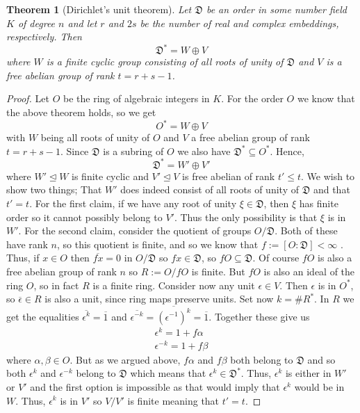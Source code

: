 \documentclass{article}
\newtheorem{theorem}{Theorem}[section]
\newcommand{\mfrak}[1]{\mathfrak{#1}}
\numberwithin{equation}{section}
\begin{document}
\begin{theorem}[Dirichlet's unit theorem]\label{thm: Generalized Dirichlet}
	Let $\mfrak D$ be an order in some number field $K$ of degree $n$ and let $r$ and $2s$ be the number of real and complex embeddings, respectively. Then $$\mfrak D^* = W \oplus V$$
	where $W$ is a finite cyclic group consisting of all roots of unity of $\mfrak D$ and $V$ is a free abelian group of rank $t = r + s - 1$.
\end{theorem}
\begin{proof}
	Let $O$ be the ring of algebraic integers in $K$. For the order $O$ we know that the above theorem holds, so we get
	$$O^* = W \oplus V$$
	with $W$ being all roots of unity of $O$ and $V$ a free abelian group of rank $t = r + s -1$. Since $\mfrak D$ is a subring of $O$ we also have $\mfrak D^* \subseteq O^*$. Hence, $$\mfrak D^* = W' \oplus V'$$
	where $W' \trianglelefteq W$ is finite cyclic and $V' \trianglelefteq V$ is free abelian of rank $t' \leq t$. We wish to show two things; That $W'$ does indeed consist of all roots of unity of $\mfrak D$ and that $t' = t$. For the first claim, if we have any root of unity $\xi \in \mfrak{D}$, then $\xi$ has finite order so it cannot possibly belong to $V'$. Thus the only possibility is that $\xi$ is in $W'$. For the second claim, consider the quotient of groups $O / \mfrak D$. Both of these have rank $n$, so this quotient is finite, and so we know that $f := [O : \mfrak D] < \infty$ . Thus, if $x \in O$ then $\overline {fx} = 0$ in $O / \mfrak D$ so $fx \in \mfrak D$, so $f O \subseteq \mfrak D$. Of course $f O$ is also a free abelian group of rank $n$ so $R := O / f O$ is finite. But $fO$ is also an ideal of the ring $O$, so in fact $R$ is a finite ring. Consider now any unit $\epsilon \in V$. Then $\epsilon$ is in $O^*$, so $\overline \epsilon \in R$ is also a unit, since ring maps preserve units. Set now $k = \# R^*$. In $R$ we get the equalities $\overline {\epsilon^k} = \overline 1$ and $\overline {\epsilon^{-k}} = \overline {(\epsilon^{-1})^k} = \overline 1$. Together these give us
	\begin{align*}
    	\epsilon^k = 1 + f \alpha \\
    	\epsilon^{-k} = 1 + f \beta
	\end{align*}
	where $\alpha, \beta \in O$. But as we argued above, $f \alpha$ and $f \beta$ both belong to $\mfrak D$ and so both $\epsilon^k$ and $\epsilon^{-k}$ belong to $\mfrak D$ which means that  $\epsilon^k \in \mfrak D^*$. Thus, $\epsilon^k$ is either in $W'$ or $V'$ and the first option is impossible as that would imply that $\epsilon^k$ would be in $W$. Thus, $\epsilon^k$ is in $V'$ so $V / V'$ is finite meaning that $t' = t$.
\end{proof}
\end{document}
